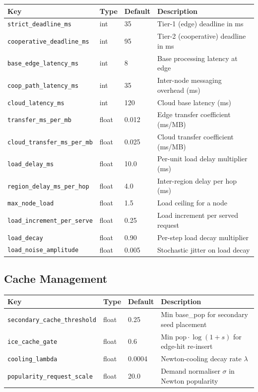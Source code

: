 \documentclass[12pt]{article}
\begin{document}
\begin{tabularx}{\linewidth}{@{}l l l X@{}}
\toprule
\textbf{Key} & \textbf{Type} & \textbf{Default} & \textbf{Description} \\
\midrule
\texttt{strict\_deadline\_ms} & int & 35 & Tier-1 (edge) deadline in ms \\
\texttt{cooperative\_deadline\_ms} & int & 95 & Tier-2 (cooperative) deadline in ms \\
\texttt{base\_edge\_latency\_ms} & int & 8 & Base processing latency at edge \\
\texttt{coop\_path\_latency\_ms} & int & 35 & Inter-node messaging overhead (ms) \\
\texttt{cloud\_latency\_ms} & int & 120 & Cloud base latency (ms) \\
\texttt{transfer\_ms\_per\_mb} & float & 0.012 & Edge transfer coefficient (ms/MB) \\
\texttt{cloud\_transfer\_ms\_per\_mb} & float & 0.025 & Cloud transfer coefficient (ms/MB) \\
\texttt{load\_delay\_ms} & float & 10.0 & Per-unit load delay multiplier (ms) \\
\texttt{region\_delay\_ms\_per\_hop} & float & 4.0 & Inter-region delay per hop (ms) \\
\texttt{max\_node\_load} & float & 1.5 & Load ceiling for a node \\
\texttt{load\_increment\_per\_serve} & float & 0.25 & Load increment per served request \\
\texttt{load\_decay} & float & 0.90 & Per-step load decay multiplier \\
\texttt{load\_noise\_amplitude} & float & 0.005 & Stochastic jitter on load decay \\
\bottomrule
\end{tabularx}

\subsection{Cache Management}

\begin{tabularx}{\linewidth}{@{}l l l X@{}}
\toprule
\textbf{Key} & \textbf{Type} & \textbf{Default} & \textbf{Description} \\
\midrule
\texttt{secondary\_cache\_threshold} & float & 0.25 & Min base\_pop for secondary seed placement \\
\texttt{ice\_cache\_gate} & float & 0.6 & Min $\text{pop} \cdot \log(1+s)$ for edge-hit re-insert \\
\texttt{cooling\_lambda} & float & 0.0004 & Newton-cooling decay rate $\lambda$ \\
\texttt{popularity\_request\_scale} & float & 20.0 & Demand normaliser $\sigma$ in Newton popularity \\
\bottomrule
\end{tabularx}
\end{document}
